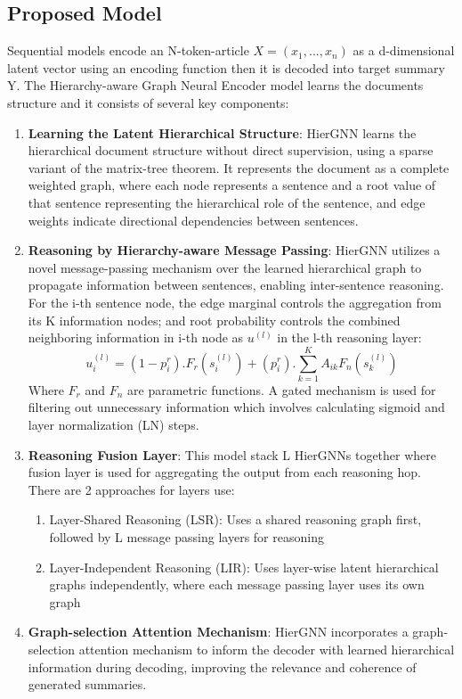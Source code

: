 \documentclass{article}
\begin{document}
\subsection{Proposed Model}
Sequential models encode an N-token-article $X = (x_1, ..., x_n)$ as a d-dimensional latent vector using an encoding function then it is decoded into target summary Y. The Hierarchy-aware Graph Neural Encoder model learns the documents structure and it consists of several key components:
\begin{enumerate}
    \item \textbf{Learning the Latent Hierarchical Structure}: HierGNN learns the hierarchical document structure without direct supervision, using a sparse variant of the matrix-tree theorem. It represents the document as a complete weighted graph, where each node represents a sentence and a root value of that sentence representing the hierarchical role of the sentence, and edge weights indicate directional dependencies between sentences.
    \item \textbf{Reasoning by Hierarchy-aware Message Passing}: HierGNN utilizes a novel message-passing mechanism over the learned hierarchical graph to propagate information between sentences, enabling inter-sentence reasoning. For the i-th sentence node, the edge marginal controls the aggregation from its
        K information nodes; and root probability controls the combined neighboring information in i-th node as $u^{(l)}$ in the l-th reasoning layer: $$u_i^{(l)} = (1 - p_i^r) . F_r(s_i^{(l)}) + (p_i^r) . \sum_{k=1}^{K} A_{ik}F_n(s_k^{(l)})$$ Where $F_r$ and $F_n$ are parametric functions. A gated mechanism is used for filtering out unnecessary information which involves calculating sigmoid and layer normalization (LN) steps.
    \item \textbf{Reasoning Fusion Layer}: This model stack L HierGNNs together where fusion layer is used for aggregating the output from each reasoning hop. There are 2 approaches for layers use: 
        \begin{enumerate}
          \item Layer-Shared Reasoning (LSR): Uses a shared reasoning graph first, followed by L message passing layers for reasoning
          \item Layer-Independent Reasoning (LIR): Uses layer-wise latent hierarchical graphs independently, where each message passing layer uses its own graph
        \end{enumerate}
    \item \textbf{Graph-selection Attention Mechanism}: HierGNN incorporates a graph-selection attention mechanism to inform the decoder with learned hierarchical information during decoding, improving the relevance and coherence of generated summaries.
\end{enumerate} 
\end{document}
